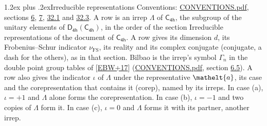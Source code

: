 \documentclass[10pt,a4paper]{article}
\makeatletter
\renewcommand\section{\@startsection{section}{1}{\z@}{-3ex plus -1ex minus -.2ex}%
  {1.2ex plus .2ex}{\normalfont\large\sffamily\bfseries\color{parttitle}}}
\numberwithin{equation}{section}
\newcommand{\eltfont}[1]{{\let\sigma\eltsigma\mathelt{#1}}}
\newcommand{\grp}[1]{\mathsf{#1}}
\newcommand{\elt}[1]{\eltfont{#1}}
\newcommand{\fsind}{\nu_{\mathrm{FS}}}
\makeatother
\begin{document}
\section{Irreducible representations}\label{s:irreps}
Conventions: \href{../../CONVENTIONS.pdf}{CONVENTIONS.pdf}, sections \href{../../../rotation/CONVENTIONS.pdf\#conv.6}{6}, \href{../../../rotation/CONVENTIONS.pdf\#conv.7}{7}, \href{../../CONVENTIONS.pdf\#conv.32.1}{32.1} and \href{../../CONVENTIONS.pdf\#conv.32.3}{32.3}.
\leavevmode\label{n:irrep.Delta}A row is an irrep $\Lambda$ of $\grp{C_{4h}}$, the subgroup of the unitary elements of $\grp{D_{4h}}(\grp{C_{4h}})$, in the order of the section Irreducible representations of the document of \href{../../../rotation/data/pdf/C4h.pdf}{$\grp{C_{4h}}$}. \label{n:index.dimension}\label{n:index.frobenius}\label{n:head.irrep}\label{n:head.reality}\label{n:head.conjugate}A row gives its dimension $d$, its Frobenius--Schur indicator $\fsind$, its reality and its complex conjugate (conjugate, a dash for the others), as in that section. \label{n:head.bilbao}\label{n:irrep.alias.gamma}Bilbao is the irrep's symbol $\Gamma_n$ in the double point group tables of [\href{../../../REFERENCES.pdf\#ref.EBW+17}{EBW+17}] (\href{../../CONVENTIONS.pdf}{CONVENTIONS.pdf}, section \href{../../../rotation/CONVENTIONS.pdf\#conv.6.5}{6.5}). \label{n:head.case.corep}\label{n:head.corep}A row also gives the indicator $\iota$ of $\Lambda$ under the representative $\elt{a}$, its case and the corepresentation that contains it (corep), named by its irreps. In case (a), $\iota = +1$ and $\Lambda$ alone forms the corepresentation. In case (b), $\iota = -1$ and two copies of $\Lambda$ form it. In case (c), $\iota = 0$ and $\Lambda$ forms it with its partner, another irrep.
\setlength{\emergencystretch}{2em}\par\setlength{\emergencystretch}{0pt}
\end{document}
